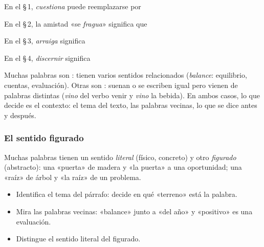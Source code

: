 \taller
{}
\begin{ejercicios}
\item En el \S\,1, \emph{cuestiona} puede reemplazarse por
\item En el \S\,2, la amistad «se \emph{fragua}» significa que
\item En el \S\,3, \emph{arraiga} significa
\item En el \S\,4, \emph{discernir} significa
\end{ejercicios}

\bitacora


Muchas palabras son : tienen varios sentidos relacionados (\emph{balance}: equilibrio, cuentas,
evaluación). Otras son : suenan o se escriben igual pero vienen de palabras distintas (\emph{vino} del
verbo venir y \emph{vino} la bebida). En ambos casos, lo que decide es el contexto: el tema del texto, las palabras
vecinas, lo que se dice antes y después.

\subsubsection{El sentido figurado}
Muchas palabras tienen un sentido \emph{literal} (físico, concreto) y otro \emph{figurado} (abstracto): una «puerta» de
madera y «la puerta» a una oportunidad; una «raíz» de árbol y «la raíz» de un problema.


\begin{regla}
\begin{itemize}
  \item Identifica el tema del párrafo: decide en qué «terreno» está la palabra.
  \item Mira las palabras vecinas: «balance» junto a «del año» y «positivo» es una evaluación.
  \item Distingue el sentido literal del figurado.
\end{itemize}
\end{regla}

